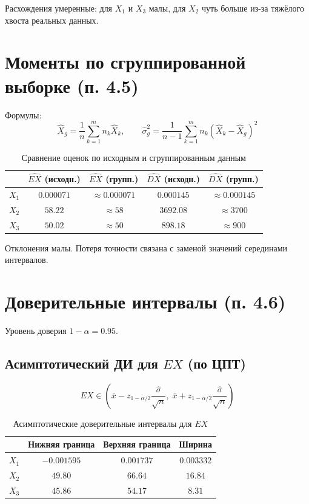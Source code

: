 \documentclass[12pt, a4paper]{article}
\begin{document}
Расхождения умеренные: для $X_1$ и $X_3$ малы, для $X_2$ чуть больше из-за тяжёлого хвоста реальных данных.

\section{Моменты по сгруппированной выборке (п. 4.5)}

Формулы:
$$\hat X_g = \frac{1}{n}\sum_{k=1}^{m} n_k \hat X_k, \qquad \hat\sigma^2_g = \frac{1}{n-1}\sum_{k=1}^{m} n_k (\hat X_k - \hat X_g)^2$$

\begin{table}[H]
\centering
\caption{Сравнение оценок по исходным и сгруппированным данным}
\begin{tabular}{lcccc}
\toprule
& $\hat{EX}$ (исходн.) & $\hat{EX}$ (групп.) & $\hat{DX}$ (исходн.) & $\hat{DX}$ (групп.) \\
\midrule
$X_1$ & $0.000071$ & $\approx 0.000071$ & $0.000145$ & $\approx 0.000145$ \\
$X_2$ & $58.22$ & $\approx 58$ & $3692.08$ & $\approx 3700$ \\
$X_3$ & $50.02$ & $\approx 50$ & $898.18$ & $\approx 900$ \\
\bottomrule
\end{tabular}
\end{table}

Отклонения малы. Потеря точности связана с заменой значений серединами интервалов.

\section{Доверительные интервалы (п. 4.6)}

Уровень доверия $1 - \alpha = 0.95$.

\subsection{Асимптотический ДИ для $EX$ (по ЦПТ)}

$$EX \in \left(\bar x - z_{1-\alpha/2}\frac{\hat\sigma}{\sqrt{n}},\; \bar x + z_{1-\alpha/2}\frac{\hat\sigma}{\sqrt{n}}\right)$$

\begin{table}[H]
\centering
\caption{Асимптотические доверительные интервалы для $EX$}
\begin{tabular}{lccc}
\toprule
& Нижняя граница & Верхняя граница & Ширина \\
\midrule
$X_1$ & $-0.001595$ & $0.001737$ & $0.003332$ \\
$X_2$ & $49.80$ & $66.64$ & $16.84$ \\
$X_3$ & $45.86$ & $54.17$ & $8.31$ \\
\bottomrule
\end{tabular}
\end{table}
\end{document}
